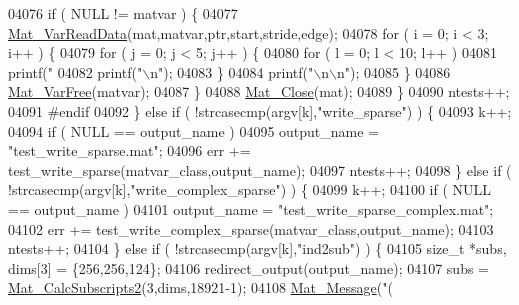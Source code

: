 \begin{DoxyCode}
{{{{{{{{{{{{{{{{{{{{{{{{{{{{{{{{{{{{{{{{{{{{{{{{{{{{{{{{{{{{{{{{{{{{04076                 \textcolor{keywordflow}{if} ( NULL != matvar ) \{
04077                     \hyperlink{group___m_a_t_ga1845000f4fc6252ec5ff11c4b9f0759f}{Mat\_VarReadData}(mat,matvar,ptr,start,stride,edge);
04078                     \textcolor{keywordflow}{for} ( i = 0; i < 3; i++ ) \{
04079                        \textcolor{keywordflow}{for} ( j = 0; j < 5; j++ ) \{
04080                           \textcolor{keywordflow}{for} ( l = 0; l < 10; l++ )
04081                               printf(\textcolor{stringliteral}{"%
04082                           printf(\textcolor{stringliteral}{"\(\backslash\)n"});
04083                         \}
04084                         printf(\textcolor{stringliteral}{"\(\backslash\)n\(\backslash\)n"});
04085                     \}
04086                     \hyperlink{group___m_a_t_ga1d14716f7450530fd1c9d02413787f0e}{Mat\_VarFree}(matvar);
04087                 \}
04088                 \hyperlink{group___m_a_t_ga101c92ff7bde4a2d4615661beba09262}{Mat\_Close}(mat);
04089             \}
04090             ntests++;
04091 \textcolor{preprocessor}{    #endif}
04092         \} \textcolor{keywordflow}{else} \textcolor{keywordflow}{if} ( !strcasecmp(argv[k],\textcolor{stringliteral}{"write\_sparse"}) ) \{
04093             k++;
04094             \textcolor{keywordflow}{if} ( NULL == output\_name )
04095                 output\_name = \textcolor{stringliteral}{"test\_write\_sparse.mat"};
04096             err += test\_write\_sparse(matvar\_class,output\_name);
04097             ntests++;
04098         \} \textcolor{keywordflow}{else} \textcolor{keywordflow}{if} ( !strcasecmp(argv[k],\textcolor{stringliteral}{"write\_complex\_sparse"}) ) \{
04099             k++;
04100             \textcolor{keywordflow}{if} ( NULL == output\_name )
04101                 output\_name = \textcolor{stringliteral}{"test\_write\_sparse\_complex.mat"};
04102             err += test\_write\_complex\_sparse(matvar\_class,output\_name);
04103             ntests++;
04104         \} \textcolor{keywordflow}{else} \textcolor{keywordflow}{if} ( !strcasecmp(argv[k],\textcolor{stringliteral}{"ind2sub"}) ) \{
04105             \textcolor{keywordtype}{size\_t} *subs, dims[3] = \{256,256,124\};
04106             redirect\_output(output\_name);
04107             subs = \hyperlink{group___m_a_t_ga5af1727403cfa3daa8567de39e1abe64}{Mat\_CalcSubscripts2}(3,dims,18921-1);
04108             \hyperlink{group__mat__util_gae7dfa394b111bc908a616f8f5bddaa97}{Mat\_Message}(\textcolor{stringliteral}{"(%
}}}}}}}}}}}}}}}}}}}}}}}}}}}}}}}}}}}}}}}}}}}}}}}}}}}}}}}}}}}}}}}}}}}}}}
\end{DoxyCode}
